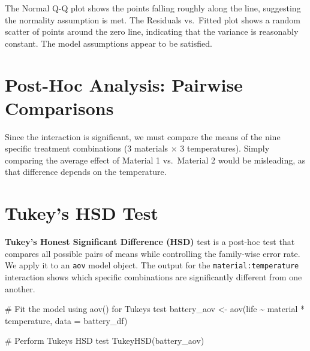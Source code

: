 \documentclass[
  letterpaper,
]{scrbook}
\newenvironment{Shaded}{\begin{snugshade}}{\end{snugshade}}
\newcommand{\AttributeTok}[1]{\textcolor[rgb]{0.40,0.45,0.13}{#1}}
\newcommand{\CommentTok}[1]{\textcolor[rgb]{0.37,0.37,0.37}{#1}}
\newcommand{\FunctionTok}[1]{\textcolor[rgb]{0.28,0.35,0.67}{#1}}
\newcommand{\NormalTok}[1]{\textcolor[rgb]{0.00,0.23,0.31}{#1}}
\newcommand{\OtherTok}[1]{\textcolor[rgb]{0.00,0.23,0.31}{#1}}
\newcommand{\SpecialCharTok}[1]{\textcolor[rgb]{0.37,0.37,0.37}{#1}}
\begin{document}
The Normal Q-Q plot shows the points falling roughly along the line,
suggesting the normality assumption is met. The Residuals vs.~Fitted
plot shows a random scatter of points around the zero line, indicating
that the variance is reasonably constant. The model assumptions appear
to be satisfied.

\section{Post-Hoc Analysis: Pairwise
Comparisons}\label{post-hoc-analysis-pairwise-comparisons}

Since the interaction is significant, we must compare the means of the
nine specific treatment combinations (3 materials × 3 temperatures).
Simply comparing the average effect of Material 1 vs.~Material 2 would
be misleading, as that difference depends on the temperature.

\section{Tukey's HSD Test}\label{tukeys-hsd-test-2}

\textbf{Tukey's Honest Significant Difference (HSD)} test is a post-hoc
test that compares all possible pairs of means while controlling the
family-wise error rate. We apply it to an \texttt{aov} model object. The
output for the \texttt{material:temperature} interaction shows which
specific combinations are significantly different from one another.

\begin{Shaded}
\begin{Highlighting}[]
\CommentTok{\# Fit the model using aov() for Tukey\textquotesingle{}s test}
\NormalTok{battery\_aov }\OtherTok{\textless{}{-}} \FunctionTok{aov}\NormalTok{(life }\SpecialCharTok{\textasciitilde{}}\NormalTok{ material }\SpecialCharTok{*}\NormalTok{ temperature, }\AttributeTok{data =}\NormalTok{ battery\_df)}

\CommentTok{\# Perform Tukey\textquotesingle{}s HSD test}
\FunctionTok{TukeyHSD}\NormalTok{(battery\_aov)}
\end{Highlighting}
\end{Shaded}
\end{document}

